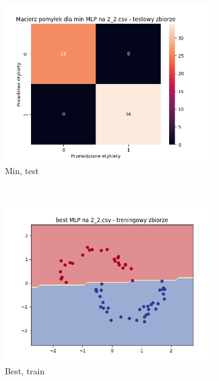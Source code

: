 \documentclass[12pt]{article}
\newcommand*{\subfigwidth}{0.24\textwidth}
\begin{document}
\begin{figure}[H]
\begin{subfigure}[t]{\subfigwidth}
        \includegraphics[width=\linewidth]{img/exp_3/mlp/2_2/min/test_matrix.png}
        \caption{Min, test}
    \end{subfigure}
    \\
    \begin{subfigure}[t]{\subfigwidth}
        \includegraphics[width=\linewidth]{img/exp_3/mlp/2_2/best/train_boundary.png}
        \caption{Best, train}
    \end{subfigure}
    \hfill
    \begin{subfigure}[t]{\subfigwidth}

\end{subfigure}
\end{figure}
\end{document}

